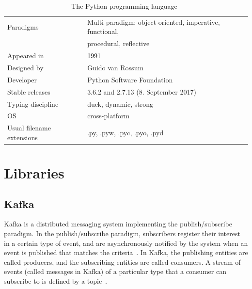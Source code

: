 \begin{table}
    \caption{The Python programming language~\cite{van2007python}}
    \label{table:python}
    \vspace{0.2cm}
    \begin{tabular}{l | l} %
        Paradigms
        & Multi-paradigm: object-oriented, imperative, functional,
        \\ & procedural, reflective
        \\ \midrule
        Appeared in
        & 1991
        \\ \midrule
        Designed by
        & Guido van Rossum
        \\ \midrule
        Developer
        & Python Software Foundation
        \\ \midrule
        Stable releases
        & 3.6.2 and 2.7.13 (8. September 2017)
        \\ \midrule
        Typing discipline
        & duck, dynamic, strong
        \\ \midrule
        OS
        & cross-platform
        \\ \midrule
        Usual filename extensions
        & .py, .pyw, .pyc, .pyo, .pyd
    \end{tabular}
\end{table}



\section{Libraries}
\label{sec:libraries}

\subsection{Kafka}
\label{subsec:kafka}

Kafka is a distributed messaging system implementing the publish/subscribe paradigm.
In the publish/subscribe paradigm, subscribers register their interest in a certain type of event,
and are asynchronously notified by the system when an event is published that matches the criteria~\cite{Eugster2003}.
In Kafka, the publishing entities are called producers, and the subscribing entities are called consumers.
A stream of events (called messages in Kafka) of a particular type that a consumer can subscribe to is defined by a topic~\cite{Kreps2015}.

